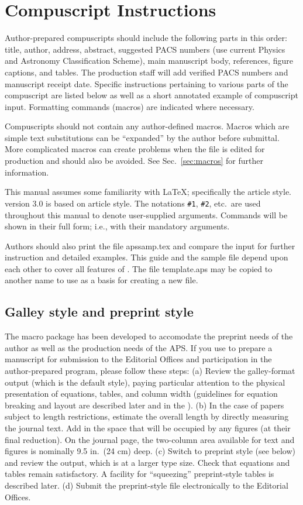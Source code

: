 \section{Compuscript Instructions}
\label{sec:instruct}

Author-prepared compuscripts should include the following parts in this
order:  title, author, address, abstract, suggested PACS numbers (use
current Physics and Astronomy Classification Scheme), main manuscript body,
references, figure captions, and tables.  The production staff will add
verified PACS numbers and manuscript receipt date. Specific instructions
pertaining to various parts of the compuscript are listed below as well as
a short annotated example of compuscript input.  Formatting commands
(macros) are indicated where necessary.

Compuscripts should not contain any author-defined macros. Macros which are
simple text substitutions can be ``expanded'' by the author before
submittal. More complicated macros can create problems when the file is
edited for production and should also be avoided. See Sec.\
\ref{sec:macros} for further information.

This manual assumes some familiarity with \LaTeX; specifically the article
style. \REVTeX{} version 3.0 is based on article style. The notations
\verb+#1+, \verb+#2+, etc.\ are used throughout this manual to denote
user-supplied arguments. Commands will be shown in their full form; i.e.,
with their mandatory arguments.

Authors should also print the file apssamp.tex and compare the input for
further instruction and detailed examples. This guide and the sample file
depend upon each other to cover all features of \REVTeX. The file
template.aps may be copied to another name to use as a basis for creating a
new \REVTeX{} file.


\subsection{Galley style and preprint style}

The \REVTeX{} macro package has been developed to accomodate the preprint
needs of the author as well as the production needs of the APS. If you use
\REVTeX{} to prepare a manuscript for submission to the Editorial Offices
and participation in the author-prepared program, please follow these
steps: (a) Review the galley-format output (which is the default style),
paying particular attention to the physical presentation of equations,
tables, and column width (guidelines for equation breaking and layout are
described later and in the \SNG). (b) In the case of papers subject to
length restrictions, estimate the overall length by directly measuring the
journal text. Add in the space that will be occupied by any figures (at
their final reduction). On the journal page, the two-column area available
for text and figures is nominally 9.5 in.\ (24 cm) deep. (c) Switch to
preprint style (see below) and review the output, which is at a larger type
size. Check that equations and tables remain satisfactory. A \REVTeX{}
facility for ``squeezing'' preprint-style tables is described later. (d)
Submit the preprint-style file electronically to the Editorial Offices.

